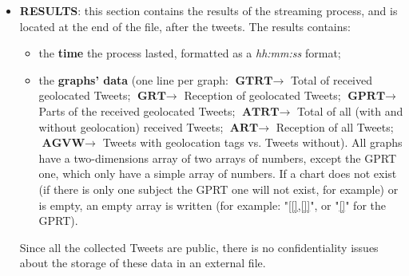 \documentclass[a4paper,11pt]{report}
\begin{document}
\begin{itemize}
	\item \textbf{RESULTS}: this section contains the results of the streaming process, and is located at the end of the file, after the tweets. The results contains:
	\begin{itemize}
		\item the \textbf{time} the process lasted, formatted as a \emph{hh:mm:ss} format;
		\item the \textbf{graphs' data} (one line per graph: $\textbf{GTRT}\to$ Total of received geolocated Tweets; $\textbf{GRT}\to$ Reception of geolocated Tweets; $\textbf{GPRT}\to$ Parts of the received geolocated Tweets; $\textbf{ATRT}\to$ Total of all (with and without geolocation) received Tweets; $\textbf{ART}\to$ Reception of all Tweets; $\textbf{AGVW}\to$ Tweets with geolocation tags vs. Tweets without). All graphs have a two-dimensions array of two arrays of numbers, except the GPRT one, which only have a simple array of numbers. If a chart does not exist (if there is only one subject the GPRT one will not exist, for example) or is empty, an empty array is written (for example: "\underline{[[],[]]}", or "\underline{[]}" for the GPRT).
	\end{itemize}
	Since all the collected Tweets are public, there is no confidentiality issues about the storage of these data in an external file.
\end{itemize}
\end{document}

